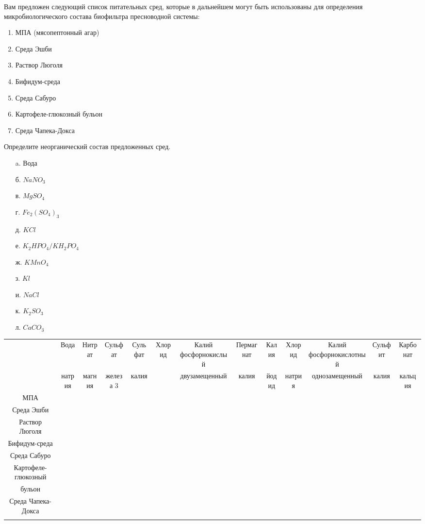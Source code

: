 
Вам предложен следующий список питательных сред, которые в дальнейшем могут быть использованы для определения микробиологического состава биофильтра пресноводной системы:

\begin{enumerate}
    \item МПА (мясопептонный агар)
    \item Среда Эшби
    \item Раствор Люголя
    \item Бифидум-среда
    \item Среда Сабуро
    \item Картофеле-глюкозный бульон
    \item Среда Чапека-Докса
\end{enumerate}

Определите неорганический состав предложенных сред.

\begin{enumerate}
    \item[a.] Вода
    \item[б.] $NaNO_3$
    \item[в.] $MgSO_4$
    \item[г.] $Fe_2(SO_4)_3$
    \item[д.] $KCl$
    \item[е.] $K_2HPO_4 / KH_2PO_4$
    \item[ж.] $KMnO_4$
    \item[з.] $Kl$
    \item[и.] $NaCl$
    \item[к.] $K_2SO_3$
    \item[л.] $CaCO_3$
\end{enumerate}

\begin{table}[!ht]
\small
\begin{tabular}{|c|c|c|c|c|c|c|c|c|c|c|c|c|}
    \hline 
    & Вода & Нитрат & Сульфат & Сульфат & Хлорид & Калий фосфорнокислый & Пермагнат & Калия & Хлорид & Калий фосфорнокислотный & Сульфит & Карбонат \\
    & натрия & магния & железа 3 & калия& & двузамещенный & калия & йодид & натрия & однозамещенный & калия & кальция \\
    МПА & & & & & & & & & & & & \\
    \hline
    Среда Эшби & & & & & & & & & & & & \\
    \hline
    Раствор Люголя & & & & & & & & & & & & \\
    \hline
    Бифидум-среда & & & & & & & & & & & & \\
    \hline
    Среда Сабуро & & & & & & & & & & & & \\
    \hline
    Картофеле-глюкозный& & & & & & & & & & & & \\
    бульон& & & & & & & & & & & & \\
    \hline
    Среда Чапека-Докса& & & & & & & & & & & & \\
    \hline
    & & & & & & & & & & & & \\

\end{tabular}
\end{table}